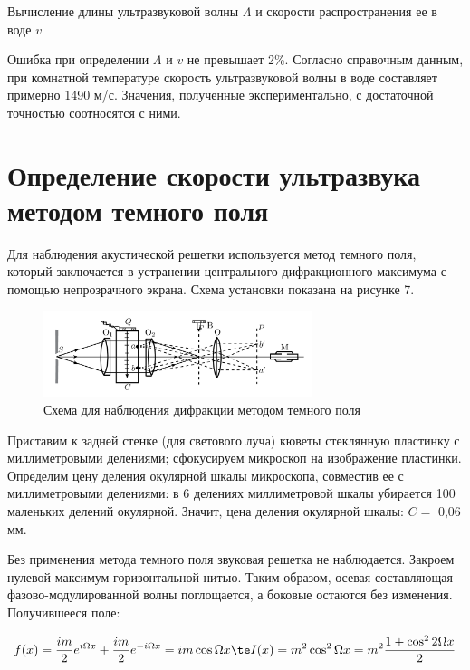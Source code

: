 \documentclass[12pt]{kiarticle}
\begin{document}
	\begin{table}[h!]
	\centering
	
	\caption{Вычисление длины ультразвуковой волны $ \Lambda $ и скорости распространения ее в воде $ v $}
	\label{speed}
\end{table}	

\newpage

Ошибка при определении $ \Lambda $ и $ v $ не превышает 2\%. Согласно справочным данным, при комнатной температуре скорость ультразвуковой волны в воде составляет примерно 1490 м/с. Значения, полученные экспериментально, с достаточной точностью соотносятся с ними.

\newpage

\section{Определение скорости ультразвука методом темного поля}

Для наблюдения акустической решетки используется метод темного поля, который заключается в устранении центрального дифракционного максимума с помощью непрозрачного экрана. Схема установки показана на рисунке 7.

	\begin{figure}[h!]
	\centering	
	\includegraphics[width=0.7\textwidth]{shema2.png}
	\caption{Схема для наблюдения дифракции методом темного поля}
	\label{shema2}
\end{figure}

Приставим к задней стенке (для светового луча) кюветы стеклянную пластинку с миллиметровыми делениями; сфокусируем микроскоп на изображение пластинки. Определим цену деления окулярной шкалы микроскопа, совместив ее с миллиметровыми делениями: в 6 делениях миллиметровой шкалы убирается 100 маленьких делений окулярной. Значит, цена деления окулярной шкалы: $ C = $ 0,06 мм.

Без применения метода темного поля звуковая решетка не наблюдается. Закроем нулевой максимум горизонтальной нитью. Таким образом, осевая составляющая фазово-модулированной волны поглощается, а боковые остаются без изменения. Получившееся поле: 

\begin{equation}\label{}
f(x) = \dfrac{im}{2} e^{i\Omega x} +  \dfrac{im}{2} e^{-i\Omega x} = im \cos \Omega x \te I(x) = m^2 \cos ^2 \Omega x = m^2 \dfrac{1 + \cos ^2 2 \Omega x}{2}
\end{equation}
\end{document}
